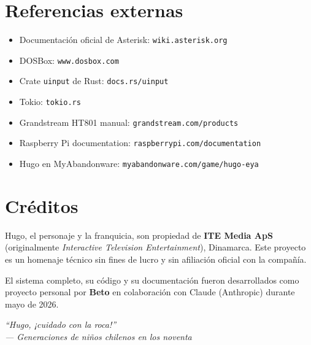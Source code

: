 \section{Referencias externas}

\begin{itemize}
  \item Documentación oficial de Asterisk: \texttt{wiki.asterisk.org}
  \item DOSBox: \texttt{www.dosbox.com}
  \item Crate \texttt{uinput} de Rust: \texttt{docs.rs/uinput}
  \item Tokio: \texttt{tokio.rs}
  \item Grandstream HT801 manual: \texttt{grandstream.com/products}
  \item Raspberry Pi documentation: \texttt{raspberrypi.com/documentation}
  \item Hugo en MyAbandonware: \texttt{myabandonware.com/game/hugo-eya}
\end{itemize}

\section{Créditos}

Hugo, el personaje y la franquicia, son propiedad de \textbf{ITE Media ApS} (originalmente \emph{Interactive Television Entertainment}), Dinamarca. Este proyecto es un homenaje técnico sin fines de lucro y sin afiliación oficial con la compañía.

El sistema completo, su código y su documentación fueron desarrollados como proyecto personal por \textbf{Beto} en colaboración con Claude (Anthropic) durante mayo de 2026.

\vspace{1cm}

\begin{center}
\itshape\small
``Hugo, ¡cuidado con la roca!''\\
--- Generaciones de niños chilenos en los noventa
\end{center}

